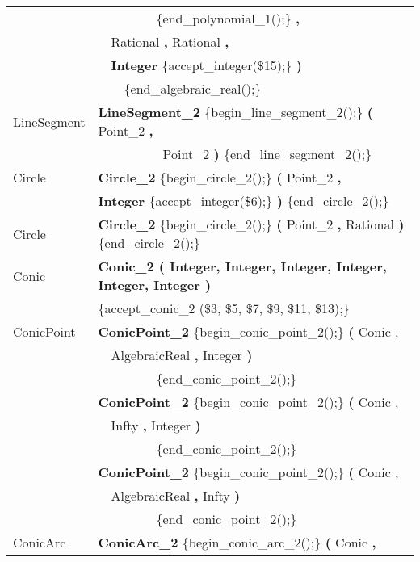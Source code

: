 \begin{ccTexOnly}
\begin{tabular}{*{2}{| l} |}
              & \ \ \ \ \ \ \ \ \ \{end\_polynomial\_1();\} {\bf \Large ,}         \\
              & \ \ Rational {\bf \Large ,} Rational {\bf \Large ,}  \\
              & \ \ {\bf Integer} \{accept\_integer(\$15);\} {\bf \Large )} \\
              & \ \ \ \ \{end\_algebraic\_real();\} \\ \hline          
LineSegment &  {\bf LineSegment\_2} \{begin\_line\_segment\_2();\} {\bf \Large (} Point\_2 {\bf \Large ,} \\
            & \ \ \ \ \ \ \ \ \ \  Point\_2 {\bf \Large )} \{end\_line\_segment\_2();\}\\ \hline
Circle   &  {\bf Circle\_2} \{begin\_circle\_2();\} {\bf \Large (} Point\_2 {\bf \Large ,} \\
         & {\bf Integer} \{accept\_integer(\$6);\} {\bf \Large )} \{end\_circle\_2();\} \\ 
Circle   &  {\bf Circle\_2} \{begin\_circle\_2();\} {\bf \Large (} Point\_2 {\bf \Large ,} Rational {\bf \Large )} \{end\_circle\_2();\} \\ \hline
Conic    & {\bf Conic\_2 ( Integer, Integer, Integer, Integer, Integer, Integer )} \\
              & \{accept\_conic\_2 (\$3, \$5, \$7, \$9, \$11, \$13);\}\\ \hline
ConicPoint    & {\bf ConicPoint\_2} \{begin\_conic\_point\_2();\} {\bf (} Conic ,            \\
              & \ \ AlgebraicReal {\bf \Large ,} Integer {\bf \Large )}  \\
              & \ \ \ \ \ \ \ \ \ \{end\_conic\_point\_2();\}\\ 
              & {\bf ConicPoint\_2} \{begin\_conic\_point\_2();\} {\bf (} Conic ,            \\
              & \ \ Infty {\bf \Large ,} Integer {\bf \Large )}  \\
              & \ \ \ \ \ \ \ \ \ \{end\_conic\_point\_2();\}\\ 
 & {\bf ConicPoint\_2} \{begin\_conic\_point\_2();\} {\bf (} Conic ,            \\
              & \ \ AlgebraicReal {\bf \Large ,} Infty {\bf \Large )}  \\
              & \ \ \ \ \ \ \ \ \ \{end\_conic\_point\_2();\}\\ \hline
ConicArc      & {\bf ConicArc\_2} \{begin\_conic\_arc\_2();\} {\bf \Large (} Conic {\bf \Large ,}   \\

\end{tabular}
\end{ccTexOnly}
